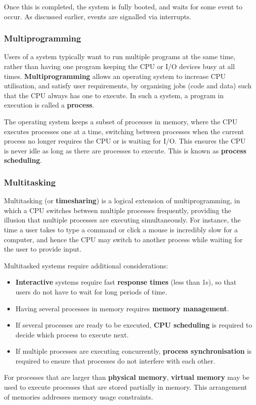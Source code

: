 \documentclass{article}
\begin{document}
Once this is completed, the system is fully booted, and waits for some event to occur. As discussed earlier, events are signalled
via interrupts.
\subsubsection{Multiprogramming}
Users of a system typically want to run multiple programs at the same time, rather than having one program keeping the CPU or I/O devices busy at all times.
\textbf{Multiprogramming} allows an operating system to increase CPU utilisation, and satisfy user requirements,
by organising jobs (code and data) such that the CPU always has one to execute.
In such a system, a program in execution is called a \textbf{process}.

The operating system keeps a subset of processes in memory, where the CPU executes processes one at a time, switching between processes
when the current process no longer requires the CPU or is waiting for I/O. This ensures the CPU is never idle as long as there are processes to execute.
This is known as \textbf{process scheduling}.
\subsubsection{Multitasking}
Multitasking (or \textbf{timesharing}) is a logical extension of multiprogramming, in which a CPU switches between multiple processes
frequently, providing the illusion that multiple processes are executing simultaneously.
For instance, the time a user takes to type a command or click a mouse is incredibly slow for a computer,
and hence the CPU may switch to another process while waiting for the user to provide input.

Multitasked systems require additional considerations:
\begin{itemize}
    \item \textbf{Interactive} systems require fast \textbf{response times} (less than 1s), so that users do not have to wait for long periods of time.
    \item Having several processes in memory requires \textbf{memory management}.
    \item If several processes are ready to be executed, \textbf{CPU scheduling} is required to decide which process to execute next.
    \item If multiple processes are executing concurrently, \textbf{process synchronisation} is required to ensure that processes do not interfere with each other.
\end{itemize}
For processes that are larger than \textbf{physical memory}, \textbf{virtual memory} may be used to execute processes that are stored partially in memory.
This arrangement of memories addresses memory usage constraints.
\end{document}
